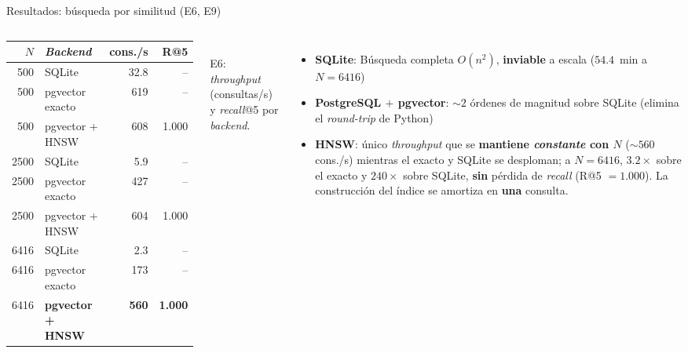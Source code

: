 \documentclass[aspectratio=1610]{beamer}
\begin{document}
\begin{frame}{Resultados: búsqueda por similitud (E6, E9)}
  \begin{columns}[c]
      \centering \small
      \setlength{\tabcolsep}{3pt}
      \begin{tabular}{rlrr}
        \toprule
        \textbf{$N$} & \textbf{\textit{Backend}} & \textbf{cons./s} & \textbf{R@5} \\
        \midrule
         500 & SQLite           &  32.8 & --    \\
         500 & pgvector exacto  &   619 & --    \\
         500 & pgvector + HNSW  &   608 & 1.000 \\
        \midrule
        2500 & SQLite           &   5.9 & --    \\
        2500 & pgvector exacto  &   427 & --    \\
        2500 & pgvector + HNSW  &   604 & 1.000 \\
        \midrule
        6416 & SQLite           &   2.3 & --    \\
        6416 & pgvector exacto  &   173 & --    \\
        6416 & \textbf{pgvector + HNSW} & \textbf{560} & \textbf{1.000} \\
        \bottomrule
      \end{tabular}\\[0.3em]
      {\scriptsize E6: \textit{throughput} (consultas/s) y \textit{recall}@5 por \textit{backend}.}
      \small
      \begin{itemize}
        \item \textbf{SQLite}: Búsqueda completa $O(n^2)$, \textbf{inviable} a
            escala ($54.4$~min a $N{=}6416$)
        \item \textbf{PostgreSQL $+$ pgvector}: ${\sim}2$ órdenes de magnitud
            sobre SQLite (elimina el \textit{round-trip} de Python)
        \item \textbf{HNSW}: único \textit{throughput} que se \textbf{mantiene
            \emph{constante} con $N$} (${\sim}560$ cons./s) mientras el exacto
            y SQLite se desploman; a $N{=}6416$, $3.2\times$ sobre el exacto y
            $240\times$ sobre SQLite, \textbf{sin} pérdida de \textit{recall}
            (R@5 $=1.000$). La construcción del índice se amortiza en
            \textbf{una} consulta. 
      \end{itemize}
  \end{columns}
\end{frame}
\end{document}
